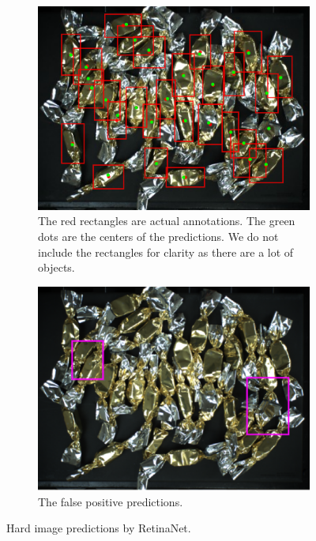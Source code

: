 \begin{figure}[H]

	\begin{subfigure}[t]{0.5\textwidth}
		\centering
		\includegraphics[width=\linewidth]{Sources/Figures/candies/actual_pred.png}
		\caption{The red rectangles are actual annotations. The green dots are
			the centers of the predictions. We do not include the rectangles for
			clarity as there are a lot of objects.}

	\end{subfigure}
	\begin{subfigure}[t]{0.5\textwidth}
		\centering
		\includegraphics[width=\linewidth]{Sources/Figures/candies/false_positive.png}
		\caption{The false positive predictions.}

	\end{subfigure}

	\caption{Hard image predictions by RetinaNet.}
	\label{fig:candies_hard}
\end{figure}

